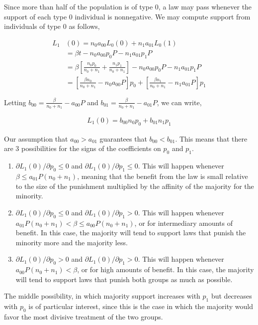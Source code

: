 Since more than half of the population is of type 0, a law may pass whenever the support of each type 0 individual is nonnegative.  We may compute support from individuals of type 0 as follows,

\begin{align}
L_1&(0) = n_0 a_{00}  L_0(0) + n_1 a_{01}  L_0(1) \\
&= \beta t - n_0 a_{00}p_0 P - n_1 a_{01}  p_1 P \\
&= \beta \left[ \frac{n_0 p_0}{n_0 + n_1}   + \frac{n_1 p_1}{n_0 + n_1} \right]  - n_0 a_{00}p_0 P - n_1 a_{01}  p_1 P \\
&= \left[  \frac{\beta n_0}{n_0 + n_1} - n_0 a_{00}P  \right]p_0 + \left[ \frac{\beta n_1}{n_0 + n_1} -  n_1 a_{01}P \right] p_1
\end{align}

Letting $b_{00} = \frac{\beta }{n_0 + n_1} -  a_{00}P $ and $b_{01} = \frac{\beta}{n_0 + n_1} -   a_{01}P $, we can write,

\begin{align}
L_1(0) = b_{00}n_0p_0 + b_{01} n_1p_1 
\end{align}

Our assumption that $a_{00} > a_{01}$ guarantees that $b_{00} < b_{01}$.  This means that there are 3 possibilities for the signs of the coefficients on $p_0$ and $p_1$.

\begin{enumerate}
\item $\partial L_1(0) / \partial p_0 \leq 0$ and $\partial L_1(0) / \partial p_1 \leq 0$.  This will happen whenever $\beta \leq   a_{01}P(n_0 + n_1)  $, meaning that the benefit from the law is small relative to the size of the punishment multiplied by the affinity of the majority for the minority.
\item $\partial L_1(0) / \partial p_0 \leq 0$ and $\partial L_1(0) / \partial p_1 > 0$.  This will happen whenever $  a_{01}P(n_0 + n_1) < \beta  \leq a_{00}P(n_0 + n_1) $, or for intermediary amounts of benefit.  In this case, the majority will tend to support laws that punish the minority more and the majority less.
\item $\partial L_1(0) / \partial p_0 > 0$ and $\partial L_1(0) / \partial p_1 > 0$.  This will happen whenever $   a_{00}P(n_0 + n_1) < \beta$, or for high amounts of benefit.  In this case, the majority will tend to support laws that punish both groups as much as possible.
\end{enumerate}

The middle possibility, in which majority support increases with $p_1$ but decreases with $p_0$ is of particular interest, since this is the case in which the majority would favor the most divisive treatment of the two groups.

